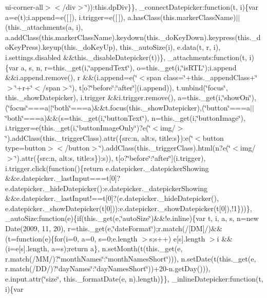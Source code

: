 \begin{DoxyCompactItemize}
ui-\/corner-\/all\textquotesingle{}$>$$<$/div$>$\char`\"{}))\+:this.\+dp\+Div\}\}, \+\_\+connect\+Datepicker\+:function(t, i)\{var a=e(t);i.\+append=e(\mbox{[}$\,$\mbox{]}), i.\+trigger=e(\mbox{[}$\,$\mbox{]}), a.\+has\+Class(this.\+marker\+Class\+Name)$\vert$$\vert$(this.\+\_\+attachments(a, i), a.\+add\+Class(this.\+marker\+Class\+Name).\+keydown(this.\+\_\+do\+Key\+Down).\+keypress(this.\+\_\+do\+Key\+Press).\+keyup(this.\+\_\+do\+Key\+Up), this.\+\_\+auto\+Size(i), e.\+data(t, r, i), i.\+settings.\+disabled \&\&this.\+\_\+disable\+Datepicker(t))\}, \+\_\+attachments\+:function(t, i)\{var a, s, n, r=this.\+\_\+get(i,\char`\"{}append\+Text\char`\"{}), o=this.\+\_\+get(i,\char`\"{}is\+R\+T\+L\char`\"{});i.\+append \&\&i.\+append.\+remove(), r \&\&(i.\+append=e(\char`\"{}$<$span class=\textquotesingle{}\char`\"{}+this.\+\_\+append\+Class+\char`\"{}\textquotesingle{}$>$\char`\"{}+r+\char`\"{}$<$/span$>$\char`\"{}), t\mbox{[}o?\char`\"{}before\char`\"{}\+:\char`\"{}after\char`\"{}\mbox{]}(i.\+append)), t.\+unbind(\char`\"{}focus\char`\"{}, this.\+\_\+show\+Datepicker), i.\+trigger \&\&i.\+trigger.\+remove(), a=this.\+\_\+get(i,\char`\"{}show\+On\char`\"{}),(\char`\"{}focus\char`\"{}===a$\vert$$\vert$\char`\"{}both\char`\"{}===a)\&\&t.\+focus(this.\+\_\+show\+Datepicker),(\char`\"{}button\char`\"{}===a$\vert$$\vert$\char`\"{}both\char`\"{}===a)\&\&(s=this.\+\_\+get(i,\char`\"{}button\+Text\char`\"{}), n=this.\+\_\+get(i,\char`\"{}button\+Image\char`\"{}), i.\+trigger=e(this.\+\_\+get(i,\char`\"{}button\+Image\+Only\char`\"{})?e(\char`\"{}$<$img/$>$\char`\"{}).\+add\+Class(this.\+\_\+trigger\+Class).\+attr(\{src\+:n, alt\+:s, title\+:s\})\+:e(\char`\"{}$<$button type=\textquotesingle{}button\textquotesingle{}$>$$<$/button$>$\char`\"{}).\+add\+Class(this.\+\_\+trigger\+Class).\+html(n?e(\char`\"{}$<$img/$>$\char`\"{}).\+attr(\{src\+:n, alt\+:s, title\+:s\})\+:s)), t\mbox{[}o?\char`\"{}before\char`\"{}\+:\char`\"{}after\char`\"{}\mbox{]}(i.\+trigger), i.\+trigger.\+click(function()\{return e.\+datepicker.\+\_\+datepicker\+Showing \&\&e.\+datepicker.\+\_\+last\+Input===t\mbox{[}0\mbox{]}?e.\+datepicker.\+\_\+hide\+Datepicker()\+:e.\+datepicker.\+\_\+datepicker\+Showing \&\&e.\+datepicker.\+\_\+last\+Input!==t\mbox{[}0\mbox{]}?(e.\+datepicker.\+\_\+hide\+Datepicker(), e.\+datepicker.\+\_\+show\+Datepicker(t\mbox{[}0\mbox{]}))\+:e.\+datepicker.\+\_\+show\+Datepicker(t\mbox{[}0\mbox{]}),!1\}))\}, \+\_\+auto\+Size\+:function(e)\{if(this.\+\_\+get(e,\char`\"{}auto\+Size\char`\"{})\&\&!e.\+inline)\{var t, i, a, s, n=new Date(2009, 11, 20), r=this.\+\_\+get(e,\char`\"{}date\+Format\char`\"{});r.\+match(/\mbox{[}\+D\+M\mbox{]}/)\&\&(t=function(e)\{for(i=0, a=0, s=0;e.\+length $>$s;s++) e\mbox{[}s\mbox{]}.\+length $>$i \&\&(i=e\mbox{[}s\mbox{]}.\+length, a=s);return a\}, n.\+set\+Month(t(this.\+\_\+get(e, r.\+match(/\+M\+M/)?\char`\"{}month\+Names\char`\"{}\+:\char`\"{}month\+Names\+Short\char`\"{}))), n.\+set\+Date(t(this.\+\_\+get(e, r.\+match(/\+D\+D/)?\char`\"{}day\+Names\char`\"{}\+:\char`\"{}day\+Names\+Short\char`\"{}))+20-\/n.\+get\+Day())), e.\+input.\+attr(\char`\"{}size\char`\"{}, this.\+\_\+format\+Date(e, n).\+length)\}\}, \+\_\+inline\+Datepicker\+:function(t, i)\{var 
\end{DoxyCompactItemize}
